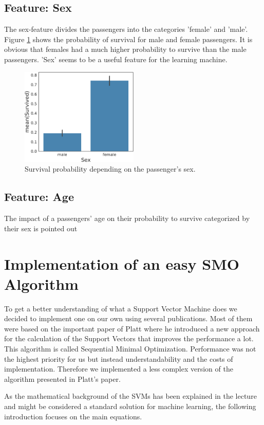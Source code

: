 \subsection{Feature: Sex}
The sex-feature divides the passengers into the categories 'female' and 'male'. Figure \ref{fig:sexfeat} shows the probability of survival for male and female passengers. It is obvious that females had a much higher probability to survive than the male passengers. 'Sex' seems to be a useful feature for the learning machine.
 \begin{figure}
 	\centering
    \includegraphics[width=0.5\textwidth]{media_saved/sex_survived}
  \caption{Survival probability depending on the passenger's sex.}
  \label{fig:sexfeat}
 \end{figure}

\subsection{Feature: Age}
The impact of a passengers' age on their probability to survive categorized by their sex is pointed out 

\section{Implementation of an easy SMO Algorithm}
To get a better understanding of what a Support Vector Machine does we decided to implement one on our own using several publications. Most of them were based on the important paper of Platt \cite{platt} where he introduced a new approach for the calculation of the Support Vectors that improves the performance a lot. This algorithm is called Sequential Minimal Optimization. Performance was not the highest priority for us but instead understandability and the costs of implementation. Therefore we implemented a less complex version of the algorithm presented in Platt's paper.

As the mathematical background of the SVMs has been explained in the lecture and might be considered a standard solution for machine learning, the following introduction focuses on the main equations.

